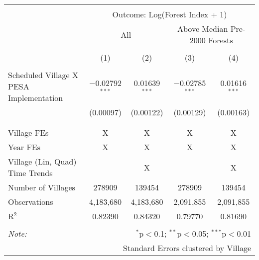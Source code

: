 
\begin{table}[!htbp] \centering
  \label{table:vcf_regs}
\begin{tabular}{@{\extracolsep{5pt}}lcccc}
\\[-1.8ex]\hline
\hline \\[-1.8ex]
 & \multicolumn{4}{c}{Outcome: Log(Forest Index + 1)} \\
\cline{2-5}
 & \multicolumn{2}{c}{All} & \multicolumn{2}{c}{Above Median Pre-2000 Forests} \\
\\[-1.8ex] & (1) & (2) & (3) & (4)\\
\hline \\[-1.8ex]
 Scheduled Village X PESA Implementation & $-$0.02792$^{***}$ & 0.01639$^{***}$ & $-$0.02785$^{***}$ & 0.01616$^{***}$ \\
  & (0.00097) & (0.00122) & (0.00129) & (0.00163) \\
  & & & & \\
\hline \\[-1.8ex]
Village FEs & X & X & X & X \\
Year FEs & X & X & X & X \\
Village (Lin, Quad) Time Trends &  & X &  & X \\
Number of Villages & 278909 & 139454 & 278909 & 139454 \\
Observations & 4,183,680 & 4,183,680 & 2,091,855 & 2,091,855 \\
R$^{2}$ & 0.82390 & 0.84320 & 0.79770 & 0.81690 \\
\hline
\hline \\[-1.8ex]
\textit{Note:}  & \multicolumn{4}{r}{$^{*}$p$<$0.1; $^{**}$p$<$0.05; $^{***}$p$<$0.01} \\
 & \multicolumn{4}{r}{Standard Errors clustered by Village} \\
\end{tabular}
\end{table}
